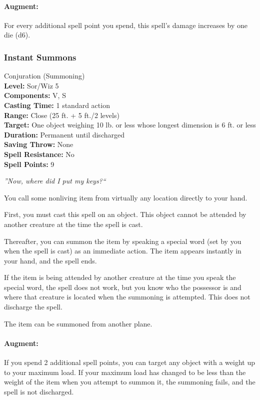 \paragraph{Augment:} For every additional spell point you spend, this spell's damage increases by one die (d6).
\subsubsection{Instant Summons}
\label{Spell:InstantSummons}
Conjuration (Summoning)
\\ \textbf{Level:} Sor/Wiz 5
\\ \textbf{Components:} V, S
\\ \textbf{Casting Time:} 1 standard action
\\ \textbf{Range:} Close (25 ft. + 5 ft./2 levels)
\\ \textbf{Target:} One object weighing 10 lb. or less whose longest dimension is 6 ft. or less
\\ \textbf{Duration:} Permanent until discharged
\\ \textbf{Saving Throw:} None
\\ \textbf{Spell Resistance:} No
\\ \textbf{Spell Points:} 9

\emph{''Now, where did I put my keys?``}

You call some nonliving item from virtually any location directly to your hand.

First, you must cast this spell on an object.
This object cannot be attended by another creature at the time the spell is cast.

Thereafter, you can summon the item by speaking a special word (set by you when the spell is cast) as an immediate action. 
The item appears instantly in your hand, and the spell ends.

If the item is being attended by another creature at the time you speak the special word, the spell does not work, 
but you know who the possessor is and where that creature is located when the summoning is attempted.
This does not discharge the spell.

The item can be summoned from another plane.

\paragraph{Augment:} If you spend 2 additional spell points, you can target any object with a weight up to your maximum load.
If your maximum load has changed to be less than the weight of the item when you attempt to summon it, the summoning fails, 
and the spell is not discharged.
